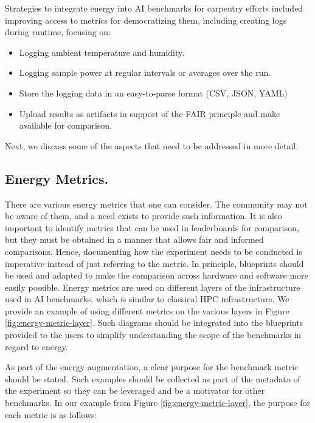 Strategies to integrate energy into AI benchmarks for  carpentry efforts included improving access to metrics for democratizing them, including creating logs during runtime, focusing on:

\begin{itemize}
    \item Logging ambient temperature and humidity.
    \item Logging sample power at regular intervals or averages over the run.
    \item Store the logging data in an easy-to-parse format (CSV, JSON, YAML) 
    \item Upload results as artifacts in support of the FAIR principle and make available for comparison.
\end{itemize}

Next, we discuss some of the aspects that need to be addressed in more detail.


\subsection{Energy Metrics.}

There are various energy metrics that one can consider. The community may not be aware of them, and a need exists to provide such information. It is also important to identify metrics that can be used in leaderboards for comparison, but they must be obtained in a manner that allows fair and informed comparisons. Hence, documenting how the experiment needs to be conducted is imperative instead of just referring to the metric. In principle, blueprints should be used and adapted to make the comparison across hardware and software more easily possible. Energy metrics are used on different layers of the infrastructure used in AI benchmarks, which is similar to classical HPC infrastructure. We provide an example of using different metrics on the various layers in Figure \ref{fig:energy-metric-layer}. Such diagrams should be integrated into the blueprints provided to the users to simplify understanding the scope of the benchmarks in regard to energy.



As part of the energy augmentation, a clear purpose for the benchmark metric should be stated. 
Such examples should be collected as part of the metadata of the experiment so they can be leveraged and be a motivator for other benchmarks.  In our example from Figure \ref {fig:energy-metric-layer}, the purpose for each metric is as follows:

